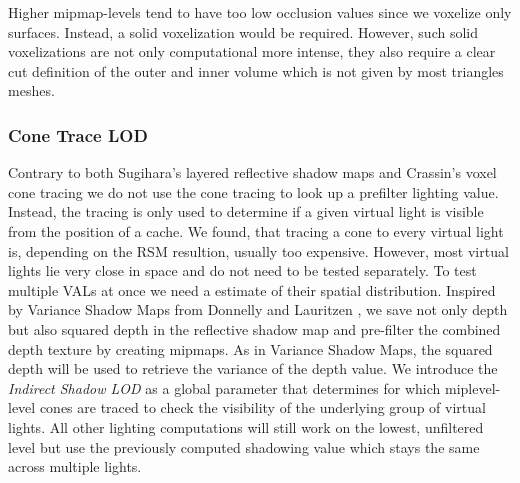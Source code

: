 \documentclass[thesis.tex]{subfiles}
\begin{document}
Higher mipmap-levels tend to have too low occlusion values since we voxelize only surfaces.
Instead, a solid voxelization would be required.
However, such solid voxelizations are not only computational more intense, they also  require a clear cut definition of the outer and inner volume which is not given by most triangles meshes.

\subsubsection{Cone Trace LOD}
Contrary to both Sugihara's layered reflective shadow maps and Crassin's voxel cone tracing we do not use the cone tracing to look up a prefilter lighting value.
Instead, the tracing is only used to determine if a given virtual light is visible from the position of a cache.
We found, that tracing a cone to every virtual light is, depending on the RSM resultion, usually too expensive.
However, most virtual lights lie very close in space and do not need to be tested separately.
To test multiple VALs at once we need a estimate of their spatial distribution.
Inspired by Variance Shadow Maps from Donnelly and Lauritzen \cite{bib:vsm}, we save not only depth but also squared depth in the reflective shadow map and pre-filter the combined depth texture by creating mipmaps.
As in Variance Shadow Maps, the squared depth will be used to retrieve the variance of the depth value.
We introduce the \emph{Indirect Shadow LOD} as a global parameter that determines for which miplevel-level cones are traced to check the visibility of the underlying group of virtual lights. 
All other lighting computations will still work on the lowest, unfiltered level but use the previously computed shadowing value which stays the same across multiple lights.\\
\end{document}
